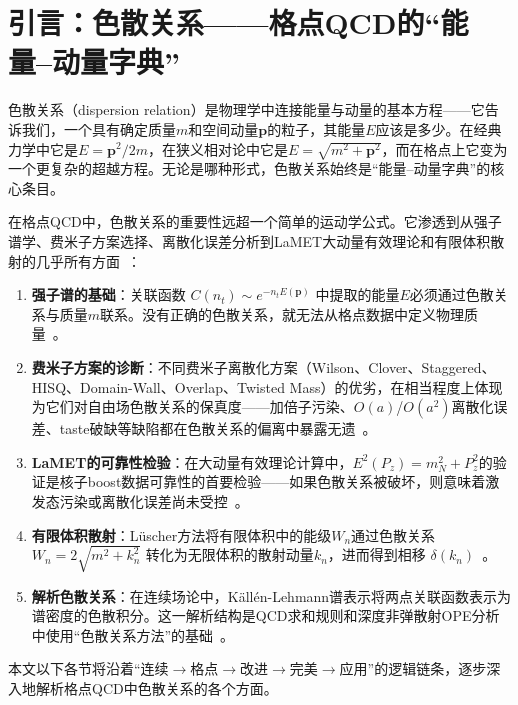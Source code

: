 \documentclass[12pt,a4paper]{ctexart}
\theoremstyle{definition}
\begin{document}
\tableofcontents
\newpage

\section{引言：色散关系——格点QCD的``能量--动量字典''}

色散关系（dispersion relation）是物理学中连接能量与动量的基本方程——它告诉我们，一个具有确定质量$m$和空间动量$\mathbf{p}$的粒子，其能量$E$应该是多少。在经典力学中它是$E = \mathbf{p}^2/2m$，在狭义相对论中它是$E = \sqrt{m^2 + \mathbf{p}^2}$，而在格点上它变为一个更复杂的超越方程。无论是哪种形式，色散关系始终是``能量--动量字典''的核心条目。

在格点QCD中，色散关系的重要性远超一个简单的运动学公式。它渗透到从强子谱学、费米子方案选择、离散化误差分析到LaMET大动量有效理论和有限体积散射的几乎所有方面~\cite{GattringerLang2010,GuptaLatticeQCD}：

\begin{enumerate}[leftmargin=*]
    \item \textbf{强子谱的基础}：关联函数 $C(n_t) \sim e^{-n_t E(\mathbf{p})}$ 中提取的能量$E$必须通过色散关系与质量$m$联系。没有正确的色散关系，就无法从格点数据中定义物理质量~\cite{GattringerLang2010}。
    \item \textbf{费米子方案的诊断}：不同费米子离散化方案（Wilson、Clover、Staggered、HISQ、Domain-Wall、Overlap、Twisted Mass）的优劣，在相当程度上体现为它们对自由场色散关系的保真度——加倍子污染、$O(a)$/$O(a^2)$离散化误差、taste破缺等缺陷都在色散关系的偏离中暴露无遗~\cite{GattringerLang2010}。
    \item \textbf{LaMET的可靠性检验}：在大动量有效理论计算中，$E^2(P_z) = m_N^2 + P_z^2$的验证是核子boost数据可靠性的首要检验——如果色散关系被破坏，则意味着激发态污染或离散化误差尚未受控~\cite{hadronSpectroscopy2026}。
    \item \textbf{有限体积散射}：L\"uscher方法将有限体积中的能级$W_n$通过色散关系 $W_n = 2\sqrt{m^2 + k_n^2}$ 转化为无限体积的散射动量$k_n$，进而得到相移 $\delta(k_n)$~\cite{GattringerLang2010}。
    \item \textbf{解析色散关系}：在连续场论中，K\"all\'en-Lehmann谱表示将两点关联函数表示为谱密度的色散积分。这一解析结构是QCD求和规则和深度非弹散射OPE分析中使用``色散关系方法''的基础~\cite{PeskinSchroeder1995}。
\end{enumerate}

本文以下各节将沿着``连续$\to$格点$\to$改进$\to$完美$\to$应用''的逻辑链条，逐步深入地解析格点QCD中色散关系的各个方面。
\end{document}
